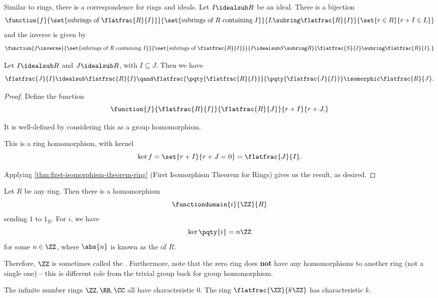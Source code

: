 \begin{remark}
    Similar to rings, there is a correspondence for rings and ideals. Let \(I \idealsub R\) be an ideal. There is a bijection
    \[
        \function{f}{\set{\text{subrings of }\flatfrac{R}{I}}}{\set{\text{subrings of }R\text{ containing }I}}{L \subring \flatfrac{R}{I}}{\set{r \in R}{r + I \in L}}
    \]
    and the inverse is given by
    \[
        \function{f\inverse}{\set{\text{subrings of }R\text{ containing }I}}{\set{\text{subrings of }\flatfrac{R}{I}}}{I \idealsub S \subring R}{\flatfrac{S}{I} \subring \flatfrac{R}{I}.}
    \]
\end{remark}

\begin{theorem}
    \label{thm:third-isomorphism-theorem-ring}%
    Let \(I \idealsub R\) and \(J \idealsub R\), with \(I \subseteq J\). Then we have
    \[
        \flatfrac{J}{I} \idealsub \flatfrac{R}{I} \qand \flatfrac{\pqty{\flatfrac{R}{I}}}{\pqty{\flatfrac{J}{I}}} \isomorphic \flatfrac{R}{J}.
    \]
\end{theorem}

\begin{proof}
    Define the function
    \[
        \function{f}{\flatfrac{R}{I}}{\flatfrac{R}{J}}{r + I}{r + J.}
    \]

    It is well-defined by considering this as a group homomorphism.

    This is a ring homomorphism, with kernel
    \[
        \ker f = \set{r + I}{r + J = 0} = \flatfrac{J}{I}.
    \]

    Applying \autoref{thm:first-isomorphism-theorem-ring} (First Isomorphism Theorem for Rings) gives us the result, as desired.
\end{proof}

\begin{proposition}
    \label{prop:ring-homomorphism-z-characteristic-of-ring}%
    Let \(R\) be any ring. Then there is a homomorphism
    \[
        \functiondomain{i}{\ZZ}{R}
    \]
    sending \(1\) to \(1_R\). For \(i\), we have
    \[
        \ker\pqty{i} = n \ZZ
    \]
    for some \(n \in \ZZ\), where \(\abs{n}\) is known as the  of \(R\).
\end{proposition}

Therefore, \(\ZZ\) is sometimes called the . Furthermore, note that the zero ring does \textbf{not} have any homomorphisms to another ring (not a single one) -- this is different role from the trivial group back for group homomorphism.

\begin{example}
    The infinite number rings \(\ZZ, \RR, \CC\) all have characteristic \(0\). The ring \(\flatfrac{\ZZ}{k\ZZ}\) has characteristic \(k\).
\end{example}